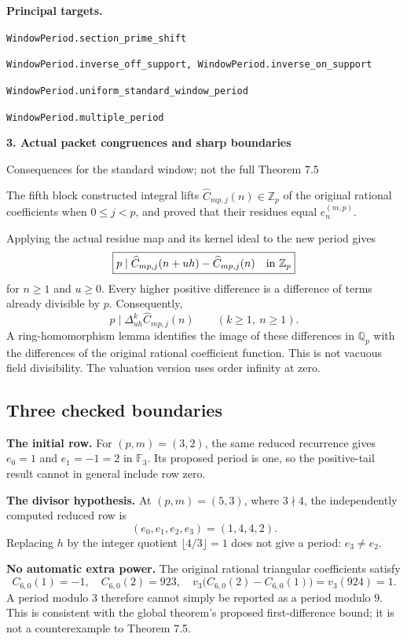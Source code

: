 \documentclass[11pt]{article}
\newcommand{\Z}{\mathbb Z}\newcommand{\N}{\mathbb N}\newcommand{\Q}{\mathbb Q}\newcommand{\F}{\mathbb F}
\newcommand{\target}[1]{{\footnotesize\texttt{#1}}}
\newcommand{\pageheading}[2]{{\Large\bfseries\color{ink}#1}\par{\small #2}\par\medskip}
\begin{document}
\textbf{Principal targets.}\par
\target{WindowPeriod.section\_prime\_shift}\par
\target{WindowPeriod.inverse\_off\_support, WindowPeriod.inverse\_on\_support}\par
\target{WindowPeriod.uniform\_standard\_window\_period}\par
\target{WindowPeriod.multiple\_period}

\newpage
\pageheading{3. Actual packet congruences and sharp boundaries}{Consequences for the standard window; not the full Theorem 7.5}
The fifth block constructed integral lifts $\widehat C_{mp,j}(n)\in\Z_p$ of the original rational coefficients when $0\le j<p$, and proved that their residues equal $e_n^{(m,p)}$.

Applying the actual residue map and its kernel ideal to the new period gives
\[
 \boxed{p\mid\widehat C_{mp,j}(n+uh)-\widehat C_{mp,j}(n)
       \quad\hbox{in }\Z_p}
\]
for $n\ge1$ and $u\ge0$. Every higher positive difference is a difference of terms already divisible by $p$. Consequently,
\[
 p\mid\Delta_{uh}^{k}\widehat C_{mp,j}(n)\qquad(k\ge1,\ n\ge1).
\]
A ring-homomorphism lemma identifies the image of these differences in $\Q_p$ with the differences of the original rational coefficient function. This is not vacuous field divisibility. The valuation version uses order infinity at zero.

\subsection*{Three checked boundaries}
\textbf{The initial row.} For $(p,m)=(3,2)$, the same reduced recurrence gives $e_0=1$ and $e_1=-1=2$ in $\F_3$. Its proposed period is one, so the positive-tail result cannot in general include row zero.

\textbf{The divisor hypothesis.} At $(p,m)=(5,3)$, where $3\nmid4$, the independently computed reduced row is
\[
 (e_0,e_1,e_2,e_3)=(1,4,4,2).
\]
Replacing $h$ by the integer quotient $\lfloor4/3\rfloor=1$ does not give a period: $e_3\ne e_2$.

\textbf{No automatic extra power.} The original rational triangular coefficients satisfy
\[
 C_{6,0}(1)=-1,\quad C_{6,0}(2)=923,\quad
 v_3\bigl(C_{6,0}(2)-C_{6,0}(1)\bigr)=v_3(924)=1.
\]
A period modulo $3$ therefore cannot simply be reported as a period modulo $9$. This is consistent with the global theorem's proposed first-difference bound; it is not a counterexample to Theorem 7.5.
\end{document}
